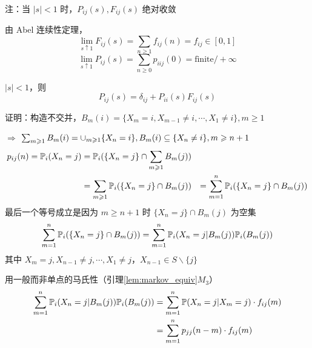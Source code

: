 注：当 $|s|<1$ 时，$P_{ij}(s),F_{ij}(s)$ 绝对收敛

由 Abel 连续性定理，
\[
\lim_{s\uparrow 1}F_{ij}(s)=\sum_{n\geq 1}f_{ij}(n)=f_{ij}\in [0,1]
\]
\[
\lim_{s\uparrow 1}P_{ij}(s)=\sum_{n\geq 0}p_{iij}(0)=\text{finite}/+\infty
\]
\begin{lemma}
    $|s|<1$，则
    \[
    P_{ij}(s)=\delta_{ij}+P_{ii}(s)F_{ij}(s)
    \]
\end{lemma}

证明：构造不交并，$B_m(i)=\{X_m=i,X_{m-1}\neq i,\cdots,X_1\neq i\}, m\geq 1$

$\Rightarrow$ $\sum_{m\geqslant 1}B_m(i)=\cup_{m\geqslant 1}\{X_n=i\}, B_m(i)\subseteq \{X_n\neq i\}, m\geqslant n+1$
\[
\begin{aligned}
    p_{ij}(n)=\mathbb{P}_i(X_n=j)&=\mathbb{P}_i(\{X_n=j\}\cap \sum_{m\geqslant 1}B_m(j))\\
    &=\sum_{m\geqslant 1}\mathbb{P}_i(\{X_n=j\}\cap B_m(j))
    &=\sum_{m=1}^n\mathbb{P}_i(\{X_n=j\}\cap B_m(j))
\end{aligned}
\]
最后一个等号成立是因为 $m\geq n+1$ 时 $\{X_n=j\}\cap B_m(j)$ 为空集
\[
\sum_{m=1}^n\mathbb{P}_i(\{X_n=j\}\cap B_m(j))=\sum_{m=1}^n\mathbb{P}_i(X_n=j|B_m(j))\mathbb{P}_i(B_m(j))
\]
其中 $X_m=j,X_{n-1}\neq j,\cdots,X_1\neq j$，$X_{n-1}\in S\backslash \{j\}$

用一般而非单点的马氏性（引理\ref{lem:markov_equiv}$M_3$）
\[
\begin{aligned}
    \sum_{m=1}^n\mathbb{P}_i(X_n=j|B_m(j))\mathbb{P}_i(B_m(j))&=\sum_{m=1}^n\mathbb{P}(X_n=j|X_m=j)\cdot f_{ij}(m)\\
    &=\sum_{m=1}^n p_{jj}(n-m)\cdot f_{ij}(m)
\end{aligned}
\]
